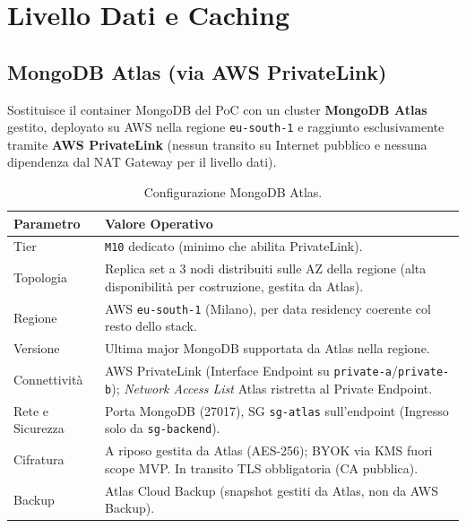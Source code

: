 \documentclass[11pt,a4paper]{article}
\begin{document}
\section{Livello Dati e Caching}
\label{sec:aws-dati}

\subsection{MongoDB Atlas (via AWS PrivateLink)}

Sostituisce il container MongoDB del PoC con un cluster \textbf{MongoDB Atlas} gestito, deployato su AWS nella regione \texttt{eu-south-1} e raggiunto esclusivamente tramite \textbf{AWS PrivateLink} (nessun transito su Internet pubblico e nessuna dipendenza dal NAT Gateway per il livello dati).

\begin{table}[H]
\centering
\caption{Configurazione MongoDB Atlas.}
\label{tab:aws-atlas}
\vspace{2mm}
\renewcommand{\arraystretch}{1.2}
\begin{tabularx}{\textwidth}{|l|X|}
\hline
\textbf{Parametro} & \textbf{Valore Operativo} \\ \hline
Tier & \texttt{M10} dedicato (minimo che abilita PrivateLink). \\ \hline
Topologia & Replica set a 3 nodi distribuiti sulle AZ della regione (alta disponibilità per costruzione, gestita da Atlas). \\ \hline
Regione & AWS \texttt{eu-south-1} (Milano), per data residency coerente col resto dello stack. \\ \hline
Versione & Ultima major MongoDB supportata da Atlas nella regione. \\ \hline
Connettività & AWS PrivateLink (Interface Endpoint su \texttt{private-a}/\texttt{private-b}); \emph{Network Access List} Atlas ristretta al Private Endpoint. \\ \hline
Rete e Sicurezza & Porta MongoDB (27017), SG \texttt{sg-atlas} sull'endpoint (Ingresso solo da \texttt{sg-backend}). \\ \hline
Cifratura & A riposo gestita da Atlas (AES-256); BYOK via KMS fuori scope MVP. In transito TLS obbligatoria (CA pubblica). \\ \hline
Backup & Atlas Cloud Backup (snapshot gestiti da Atlas, non da AWS Backup). \\ \hline
\end{tabularx}
\end{table}
\end{document}
